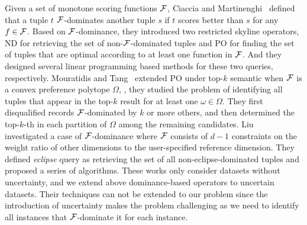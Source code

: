 Given a set of monotone scoring functions $\mathcal{F}$, Ciaccia and Martinenghi~\cite{DBLP:journals/pvldb/CiacciaM17} defined that a tuple $t$ $\mathcal{F}$-dominates another tuple $s$ if $t$ scores better than $s$ for any $f \in \mathcal{F}$.
Based on $\mathcal{F}$-dominance, they introduced two restricted skyline operators, \textsc{ND} for retrieving the set of non-$\mathcal{F}$-dominated tuples and \textsc{PO} for finding the set of tuples that are optimal according to at least one function in $\mathcal{F}$.
And they designed several linear programming based methods for these two queries, respectively.
Mouratidis and Tang~\cite{DBLP:journals/pvldb/MouratidisT18} extended \textsc{PO} under top-$k$ semantic when $\mathcal{F}$ is a convex preference polytope $\Omega$, \ie, they studied the problem of identifying all tuples that appear in the top-$k$ result for at least one $\omega \in \Omega$.
They first disqualified records $\mathcal{F}$-dominated by $k$ or more others, and then determined the top-$k$-th in each partition of $\Omega$ among the remaining candidates.
Liu \etal~\cite{DBLP:conf/icde/Liu0ZP021} investigated a case of $\mathcal{F}$-dominance where $\mathcal{F}$ consists of $d-1$ constraints on the weight ratio of other dimensions to the user-specified reference dimension.
They defined {\it eclipse} query as retrieving the set of all non-eclipse-dominated tuples and proposed a series of algorithms.
These works only consider datasets without uncertainty, and we extend above dominance-based operators to uncertain datasets.
Their techniques can not be extended to our problem since the introduction of uncertainty makes the problem challenging as we need to identify all instances that $\mathcal{F}$-dominate it for each instance.
